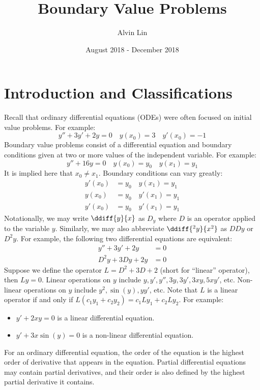 \documentclass{math}
\title{Boundary Value Problems}
\author{Alvin Lin}
\date{August 2018 - December 2018}
\begin{document}
\maketitle

\section*{Introduction and Classifications}
Recall that ordinary differential equations (ODEs) were often focused on
initial value problems. For example:
\[ y''+3y'+2y = 0 \quad y(x_0) = 3 \quad y'(x_0) = -1 \]
Boundary value problems consist of a differential equation and boundary
conditions given at two or more values of the independent variable. For example:
\[ y''+16y = 0 \quad y(x_0) = y_0 \quad y(x_1) = y_1 \]
It is implied here that \( x_0 \ne x_1 \). Boundary conditions can vary greatly:
\begin{align*}
  y'(x_0) &= y_0 \quad y(x_1) = y_1 \\
  y(x_0) &= y_0 \quad y'(x_1) = y_1 \\
  y'(x_0) &= y_0 \quad y'(x_1) = y_1
\end{align*}
Notationally, we may write \( \ddiff{y}{x} \) as \( D_y \) where \( D \) is an
operator applied to the variable \( y \). Similarly, we may also abbreviate
\( \ddiff{^2y}{x^2} \) as \( DDy \) or \( D^2y \). For example, the following
two differential equations are equivalent:
\begin{align*}
  y''+3y'+2y &= 0 \\
  D^2y+3Dy+2y &= 0
\end{align*}
Suppose we define the operator \( L = D^2+3D+2 \) (short for ``linear''
operator), then \( Ly = 0 \). Linear operations on \( y \) include
\( y, y', y'', 3y, 3y', 3xy, 5xy' \), etc. Non-linear operations on \( y \)
include \( y^2, \sin(y), yy' \), etc. Note that \( L \) is a linear operator
if and only if \( L(c_1y_1+c_2y_2) = c_1Ly_1+c_2Ly_2 \). For example:
\begin{itemize}
  \item \( y'+2xy = 0 \) is a linear differential equation.
  \item \( y'+3x\sin(y) = 0 \) is a non-linear differential equation.
\end{itemize}
For an ordinary differential equation, the order of the equation is the highest
order of derivative that appears in the equation. Partial differential equations
may contain partial derivatives, and their order is also defined by the highest
partial derivative it contains. \par
\end{document}
